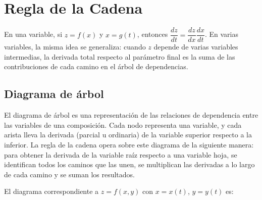 \section{Regla de la Cadena}

En una variable, si $z = f(x)$ y $x = g(t)$, entonces $\dfrac{dz}{dt} = \dfrac{dz}{dx}\dfrac{dx}{dt}$. En varias variables, la misma idea se generaliza: cuando $z$ depende de varias variables intermedias, la derivada total respecto al parámetro final es la suma de las contribuciones de cada camino en el árbol de dependencias.

\subsection{Diagrama de árbol}

El diagrama de árbol es una representación de las relaciones de dependencia entre las variables de una composición. Cada nodo representa una variable, y cada arista lleva la derivada (parcial u ordinaria) de la variable superior respecto a la inferior. La regla de la cadena opera sobre este diagrama de la siguiente manera: para obtener la derivada de la variable raíz respecto a una variable hoja, se identifican todos los caminos que las unen, se multiplican las derivadas a lo largo de cada camino y se suman los resultados.

El diagrama correspondiente a $z = f(x, y)$ con $x = x(t)$, $y = y(t)$ es:

\begin{center}
\shorthandoff{>}
\end{center}

